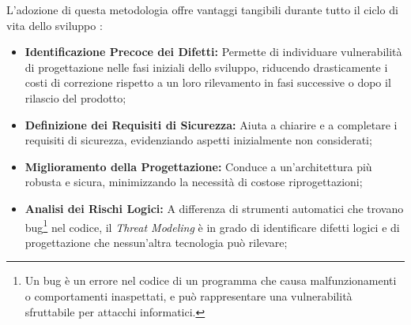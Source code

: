 
L'adozione di questa metodologia offre vantaggi tangibili durante tutto il ciclo di vita dello sviluppo \cite{libro-threat-modelling-designin-for-security}:




\begin{itemize}
    \item \textbf{Identificazione Precoce dei Difetti:} Permette di individuare vulnerabilità di progettazione nelle fasi iniziali dello sviluppo, riducendo drasticamente i costi di correzione rispetto a un loro rilevamento in fasi successive o dopo il rilascio del prodotto;
    \item \textbf{Definizione dei Requisiti di Sicurezza:} Aiuta a chiarire e a completare i requisiti di sicurezza, evidenziando aspetti inizialmente non considerati;
    \item \textbf{Miglioramento della Progettazione:} Conduce a un'architettura più robusta e sicura, minimizzando la necessità di costose riprogettazioni;
    \item \textbf{Analisi dei Rischi Logici:} A differenza di strumenti automatici che trovano bug\footnote{Un bug è un errore nel codice di un programma che causa malfunzionamenti o comportamenti inaspettati, e può rappresentare una vulnerabilità sfruttabile per attacchi informatici.} nel codice, il \textit{Threat Modeling} è in grado di identificare difetti logici e di progettazione che nessun'altra tecnologia può rilevare;
\end{itemize}

